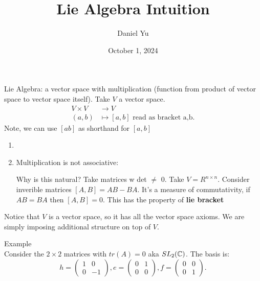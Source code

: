 \documentclass[a4paper]{article}
\title{\Huge{Lie Algebra Intuition}}
\author{\huge{Daniel Yu}}
\date{October 1, 2024}
\begin{document}
\maketitle
\newpage%
\pagebreak

Lie Algebra: a vector space with multiplication (function from product of vector space to vector space itself). Take $V$ a vector space.
\begin{align*}
  V \times V &\longrightarrow  V\\
  (a,b) &\longmapsto [a,b]   \text{ read as bracket a,b}
.\end{align*}
Note, we can use $[ab]$ as shorthand for  $[a,b]$
\begin{enumerate}
  \item 
  \item Multiplication is not associative:

    \begin{note}
      Why is this natural? Take matrices w det  $\neq$ 0. Take $V=R^{n \times n}$. Consider inverible matrices $[A,B] = AB - BA$. It's a measure of commutativity, if  $AB = BA$ then $[A,B]=0$. This has the property of \textbf{lie bracket} 
    \end{note}
\end{enumerate}


\begin{remark}
  Notice that $V$ is a vector space, so it has all the vector space axioms. We are simply imposing additional structure on top of $V$.
\end{remark}

\begin{note}{Example}\\
  Consider the $2 \times 2$ matrices with  $tr(A) = 0$ aka  $SL_2 (\mathbb{C})$. The basis is: 
  \[
     h = \begin{pmatrix} 1 & 0 \\ 0 & -1 \end{pmatrix}, e = \begin{pmatrix} 0 & 1 \\ 0 & 0 \end{pmatrix},
     f = \begin{pmatrix} 0 & 0 \\ 0 &  1 \end{pmatrix} 
  .\]  
\end{note}
\end{document}
